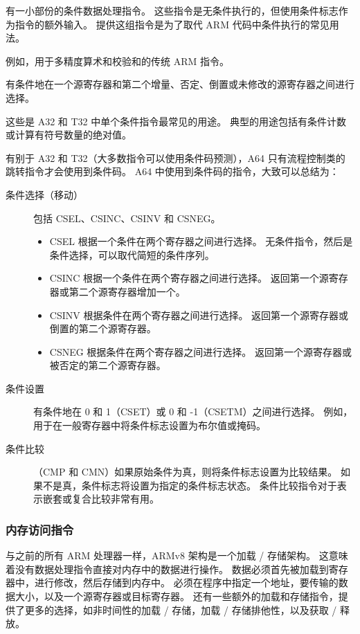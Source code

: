 有一小部份的条件数据处理指令。
这些指令是无条件执行的，但使用条件标志作为指令的额外输入。
提供这组指令是为了取代 ARM 代码中条件执行的常见用法。


例如，用于多精度算术和校验和的传统 ARM 指令。


有条件地在一个源寄存器和第二个增量、否定、倒置或未修改的源寄存器之间进行选择。

这些是 A32 和 T32 中单个条件指令最常见的用途。
典型的用途包括有条件计数或计算有符号数量的绝对值。


有别于 A32 和 T32（大多数指令可以使用条件码预测），A64 只有流程控制类的跳转指令才会使用到条件码。
A64 中使用到条件码的指令，大致可以总结为：

\begin{description}
  \item[条件选择（移动）] 包括 CSEL、CSINC、CSINV 和 CSNEG。
    \begin{itemize}
      \item CSEL 根据一个条件在两个寄存器之间进行选择。
        无条件指令，然后是条件选择，可以取代简短的条件序列。
      \item CSINC 根据一个条件在两个寄存器之间进行选择。
        返回第一个源寄存器或第二个源寄存器增加一个。
      \item CSINV 根据条件在两个寄存器之间进行选择。
        返回第一个源寄存器或倒置的第二个源寄存器。
      \item CSNEG 根据条件在两个寄存器之间进行选择。
        返回第一个源寄存器或被否定的第二个源寄存器。
    \end{itemize}
  \item[条件设置] 有条件地在 0 和 1（CSET）或 0 和 -1（CSETM）之间进行选择。
    例如，用于在一般寄存器中将条件标志设置为布尔值或掩码。
  \item[条件比较]（CMP 和 CMN）如果原始条件为真，则将条件标志设置为比较结果。
    如果不是真，条件标志将设置为指定的条件标志状态。
    条件比较指令对于表示嵌套或复合比较非常有用。
\end{description}

\subsubsection{内存访问指令}

与之前的所有 ARM 处理器一样，ARMv8 架构是一个加载 / 存储架构。
这意味着没有数据处理指令直接对内存中的数据进行操作。
数据必须首先被加载到寄存器中，进行修改，然后存储到内存中。
必须在程序中指定一个地址，要传输的数据大小，以及一个源寄存器或目标寄存器。
还有一些额外的加载和存储指令，提供了更多的选择，如非时间性的加载 / 存储，加载 / 存储排他性，以及获取 / 释放。

